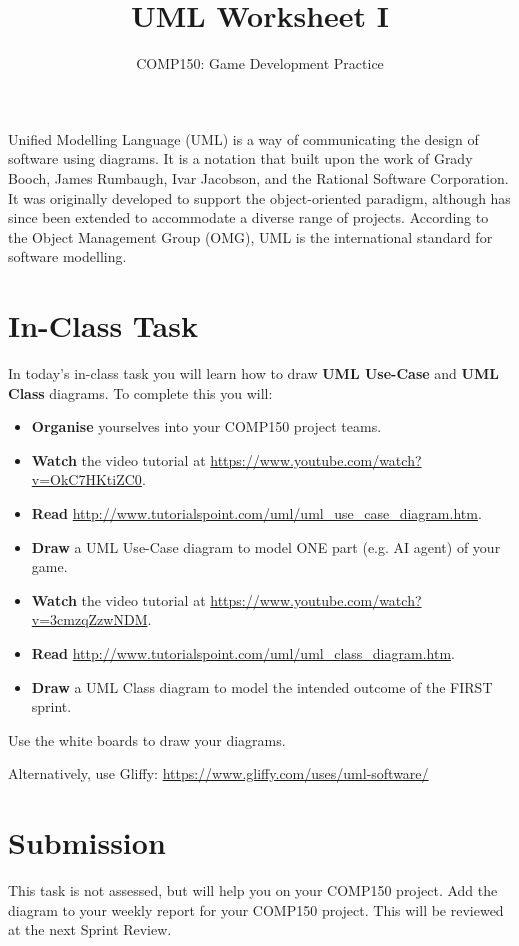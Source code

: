 \documentclass{scrartcl}
\begin{document}
\title{UML Worksheet I}
\author{COMP150: Game Development Practice}
\date{}

\maketitle

Unified Modelling Language (UML) is a way of communicating the design of software using diagrams. It is a notation that built upon the work of Grady Booch, James Rumbaugh, Ivar Jacobson, and the Rational Software Corporation. It was originally developed to support the object-oriented paradigm, although has since been extended to accommodate a diverse range of projects. According to the Object Management Group (OMG), UML is the international standard for software modelling.

\section{In-Class Task}

In today's in-class task you will learn how to draw \textbf{UML Use-Case} and \textbf{UML Class} diagrams. To complete this you will:

\begin{itemize}
	\item \textbf{Organise} yourselves into your COMP150 project teams.
	\item \textbf{Watch} the video tutorial at \url{https://www.youtube.com/watch?v=OkC7HKtiZC0}.
	\item \textbf{Read} \url{http://www.tutorialspoint.com/uml/uml_use_case_diagram.htm}.
	\item \textbf{Draw} a UML Use-Case diagram to model ONE part (e.g. AI agent) of your game.
	\item \textbf{Watch} the video tutorial at \url{https://www.youtube.com/watch?v=3cmzqZzwNDM}.
	\item \textbf{Read} \url{http://www.tutorialspoint.com/uml/uml_class_diagram.htm}.
	\item \textbf{Draw} a UML Class diagram to model the intended outcome of the FIRST sprint.
\end{itemize}

\vspace{1ex}

Use the white boards to draw your diagrams.
 
Alternatively, use Gliffy: \url{https://www.gliffy.com/uses/uml-software/}

\section{Submission}

 This task is not assessed, but will help you on your COMP150 project. Add the diagram to your weekly report for your COMP150 project. This will be reviewed at the next Sprint Review.
\end{document}
